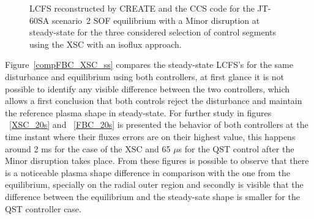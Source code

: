 \begin{figure}[h]
\caption{LCFS reconstructed by CREATE and the CCS code  for the JT-60SA scenario~2 SOF equilibrium with a Minor disruption at steady-state for the three considered selection of control segments using the XSC with an isoflux approach.}\label{all_points}

\end{figure}

Figure~\ref{compFBC_XSC_ss} compares the steady-state LCFS's for the same disturbance and equilibrium using both controllers, at first glance it is not possible to identify any visible difference between the two controllers, which allows a first conclusion that both controls reject the disturbance and maintain the reference plasma shape in steady-state. For further study in figures ~\ref{XSC_20s} and  ~\ref{FBC_20s} is presented the behavior of both controllers at the time instant where their fluxes errors are on their highest value, this happens around 2 ms for the case of the XSC and 65 $\mu$s for the QST control after the Minor disruption takes place. From these figures is possible to  observe that there is a noticeable plasma shape difference in comparison with the one from the equilibrium, specially   on the radial outer region and secondly is visible that the difference between the equilibrium and the steady-sate shape  is smaller for the QST controller case.     
\smallskip

